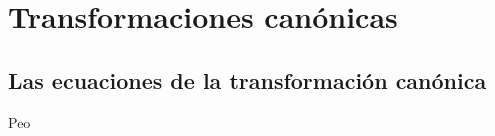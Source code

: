 \documentclass[../main.tex]{subfiles}
\begin{document}
\chapter{Transformaciones canónicas}

\section{Las ecuaciones de la transformación canónica}
Peo
\end{document}
